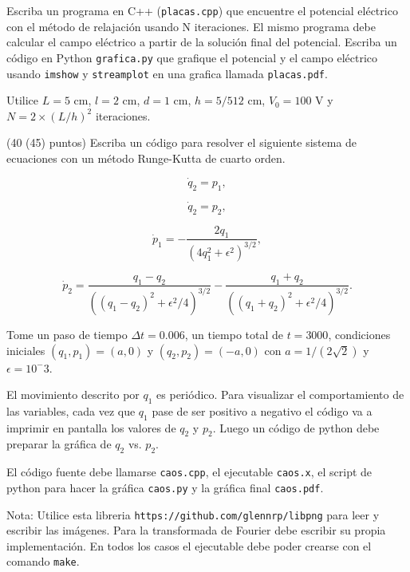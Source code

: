\documentclass[11pt,letterpaper]{exam}
\begin{document}
\begin{questions}
Escriba un programa en C++ (\verb"placas.cpp") que encuentre el
potencial el\'ectrico con el m\'etodo de relajaci\'on usando N
iteraciones. El mismo programa debe calcular el campo el\'ectrico a
partir de la soluci\'on final del potencial.
Escriba un c\'odigo en Python \verb'grafica.py' que grafique el
potencial y el campo el\'ectrico usando \verb'imshow' y
\verb'streamplot' en una grafica llamada \verb'placas.pdf'.

Utilice $L = 5$ cm, $l = 2$ cm, $d = 1$ cm, $h = 5/512$ cm, $V_0 = 100$ V y $N = 2\times (L/h)^2$ iteraciones.
 


(40 (45) puntos) Escriba un c\'odigo para resolver el siguiente
sistema de ecuaciones con un m\'etodo Runge-Kutta de cuarto orden.

\begin{equation}
\dot{q}_2 = p_1,
\end{equation}

\begin{equation}
\dot{q}_2 = p_2,
\end{equation}

\begin{equation}
\dot{p}_1 = -\frac{2q_1}{(4q_1^2 + \epsilon^2)^{3/2}},
\end{equation}

\begin{equation}
\dot{p}_2 = \frac{q_1 - q_2}{((q_1 - q_2)^2 + \epsilon^2/4)^{3/2}} -
\frac{q_1+q_2}{((q_1 + q_2)^2 + \epsilon^{2}/4)^{3/2}}.
\end{equation}


Tome un paso de tiempo $\Delta t=0.006$, un tiempo total de
$t=3000$, condiciones iniciales $(q_1, p_1)=(a,0)$ y $(q_2,
p_2)=(-a,0)$ con $a=1/(2\sqrt{2})$ y $\epsilon=10^-3$.


El movimiento descrito por $q_1$ es peri\'odico. Para visualizar el
comportamiento de las variables, cada vez que $q_1$ pase de ser
positivo a negativo el c\'odigo va a imprimir en pantalla los valores de $q_2$
y $p_2$.  Luego un c\'odigo de python debe preparar la gr\'afica de
$q_2$ vs. $p_2$.

El c\'odigo fuente debe llamarse \verb"caos.cpp", el ejecutable
\verb"caos.x", el script de python para hacer la gr\'afica
\verb"caos.py" y la gr\'afica final \verb"caos.pdf".



\end{questions}


Nota: Utilice esta libreria \verb"https://github.com/glennrp/libpng" para leer y escribir las
im\'agenes. 
Para la transformada de Fourier debe escribir su propia implementaci\'on.
En todos los casos el ejecutable debe poder crearse con el comando
\verb"make". 
\end{document}
